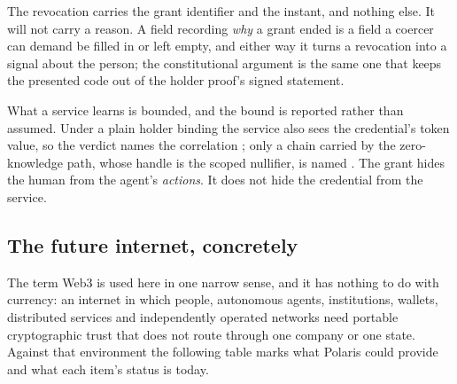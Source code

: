 The revocation carries the grant identifier and the instant, and nothing else. It will not carry a
reason. A field recording \emph{why} a grant ended is a field a coercer can demand be filled in or
left empty, and either way it turns a revocation into a signal about the person; the constitutional
argument is the same one that keeps the presented code out of the holder proof's signed statement.

What a service learns is bounded, and the bound is reported rather than assumed. Under a plain holder
binding the service also sees the credential's token value, so the verdict names the correlation
; only a chain carried by the zero-knowledge path, whose handle is the scoped
nullifier, is named . The grant hides the human from the agent's \emph{actions}. It
does not hide the credential from the service.

\subsection{The future internet, concretely}

The term Web3 is used here in one narrow sense, and it has nothing to do with currency: an internet
in which people, autonomous agents, institutions, wallets, distributed services and independently
operated networks need portable cryptographic trust that does not route through one company or one
state. Against that environment the following table marks what Polaris could provide and what each
item's status is today.

